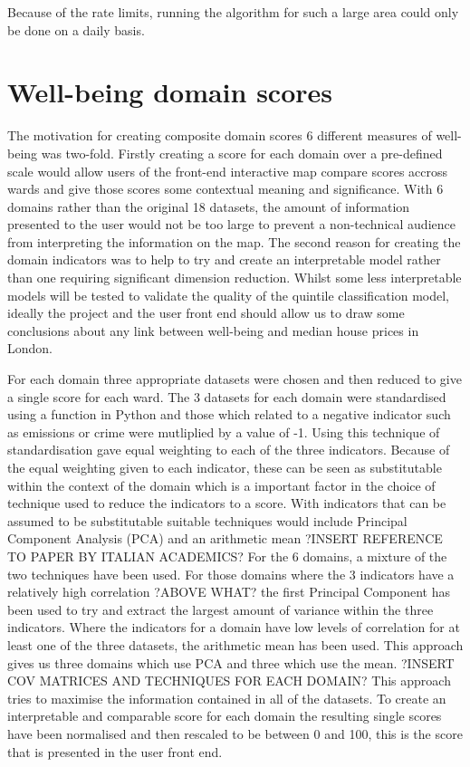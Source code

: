 Because of the rate limits, running the algorithm for such a large area could only be done on a daily basis.


\section{Well-being domain scores}

The motivation for creating composite domain scores 6 different measures of well-being was two-fold. Firstly creating a score for each domain over a pre-defined scale would allow users of the front-end interactive map compare scores accross wards and give those scores some contextual meaning and significance. With 6 domains rather than the original 18 datasets, the amount of information presented to the user would not be too large to prevent a non-technical audience from interpreting the information on the map. The second reason for creating the domain indicators was to help to try and create an interpretable model rather than one requiring significant dimension reduction. Whilst some less interpretable models will be tested to validate the quality of the quintile classification model, ideally the project and the user front end should allow us to draw some conclusions about any link between well-being and median house prices in London.

For each domain three appropriate datasets were chosen and then reduced to give a single score for each ward. The 3 datasets for each domain were standardised using a function in Python and those which related to a negative indicator such as emissions or crime were mutliplied by a value of -1. Using this technique of standardisation gave equal weighting to each of the three indicators. Because of the equal weighting given to each indicator, these can be seen as substitutable within the context of the domain which is a important factor in the choice of technique used to reduce the indicators to a score. With indicators that can be assumed to be substitutable suitable techniques would include Principal Component Analysis (PCA) and an arithmetic mean
?INSERT REFERENCE TO PAPER BY ITALIAN ACADEMICS?
For the 6 domains, a mixture of the two techniques have been used. For those domains where the 3 indicators have a relatively high correlation ?ABOVE WHAT? the first Principal Component has been used to try and extract the largest amount of variance within the three indicators. Where the indicators for a domain have low levels of correlation for at least one of the three datasets, the arithmetic mean has been used. This approach gives us three domains which use PCA and three which use the mean.
?INSERT COV MATRICES AND TECHNIQUES FOR EACH DOMAIN?
This approach tries to maximise the information contained in all of the datasets.
To create an interpretable and comparable score for each domain the resulting single scores have been normalised and then rescaled to be between 0 and 100, this is the score that is presented in the user front end.


